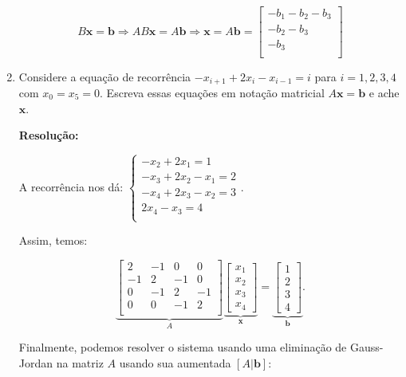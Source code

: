 \documentclass[leqno]{article}
\begin{document}
\begin{enumerate}
    $$B\textbf{x}=\textbf{b}\Rightarrow AB\textbf{x}=A\textbf{b}\Rightarrow\textbf{x}=A\textbf{b}=\begin{bmatrix}
    -b_1-b_2-b_3\\
    -b_2-b_3\\
    -b_3\\
    \end{bmatrix}$$
    
    \newpage
    
    \item Considere a equação de recorrência $-x_{i+1} + 2x_i -x_{i-1} = i$ para $i = 1, 2, 3, 4$ com $x_0 = x_5 = 0$. Escreva essas equações em notação matricial $A\textbf{x} = \textbf{b}$ e ache $\textbf{x}$.
    
    \textbf{Resolução:}
    
    A recorrência nos dá:
    $\begin{cases}
    -x_2+2x_1=1\\
    -x_3+2x_2-x_1=2\\
    -x_4+2x_3-x_2=3\\
    2x_4-x_3=4\\
    \end{cases}$.
    
    Assim, temos:
    
    $$\underbrace{\begin{bmatrix}
    2 & -1 & 0 & 0\\
    -1 & 2 & -1 & 0\\
    0 & -1 & 2 & -1\\
    0 & 0 & -1 & 2\\
    \end{bmatrix}}_A\underbrace{\begin{bmatrix}
    x_1\\
    x_2\\
    x_3\\
    x_4
    \end{bmatrix}}_\textbf{x}=\underbrace{\begin{bmatrix}
    1\\
    2\\
    3\\
    4
    \end{bmatrix}}_\textbf{b}\text{.}$$
    
    Finalmente, podemos resolver o sistema usando uma eliminação de Gauss-Jordan na matriz $A$ usando sua aumentada $[A|\textbf{b}]$:
    

\end{enumerate}
\end{document}
